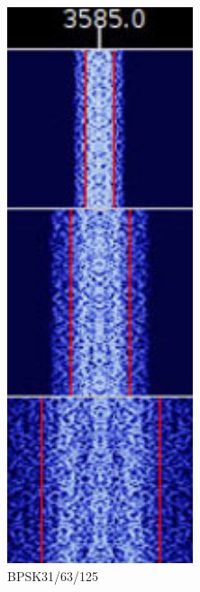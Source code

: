 \begin{frame}
\begin{columns}[c]
\begin{center}
            \includegraphics[width=1\textwidth]{e16/BPSK_31_63_125.jpg}
            \tiny \hyperlink{refs}{\cite{wc}}
            \scriptsize BPSK31/63/125
        \end{center}
    \end{columns}

\end{frame}


